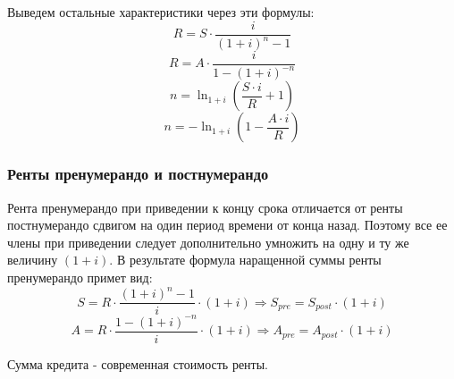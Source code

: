 \documentclass[aps,%
12pt,%
final,%
oneside,
onecolumn,%
musixtex, %
superscriptaddress,%
centertags]{article} %
\begin{document}
Выведем остальные характеристики через эти формулы:
$$ R = S \cdot \frac{i}{(1+i)^n - 1}$$
$$ R = A \cdot \frac {i}{1-(1+i)^{-n}}$$
$$ n = \ln_{1+i} \left(\frac{S \cdot i}{R} + 1 \right)$$
$$ n = -\ln_{1+i} \left(1 - \frac{A \cdot i}{R}  \right)$$

\subsubsection{Ренты пренумерандо и постнумерандо}

Рента пренумерандо при приведении к концу срока отличается от ренты постнумерандо сдвигом на один период времени от конца назад. Поэтому все ее члены при приведении следует дополнительно умножить на одну и ту же величину $(1 + i)$. В результате формула наращенной суммы ренты пренумерандо примет вид:
$$S = R \cdot \frac{(1+i)^n - 1 }{i} \cdot (1+i) \Rightarrow S_{pre} = S_{post} \cdot (1+i)$$
$$A =  R \cdot \frac {1-(1+i)^{-n}}{i} \cdot (1+i) \Rightarrow A_{pre} = A_{post} \cdot (1+i)$$

Сумма кредита - современная стоимость ренты.
\end{document}
